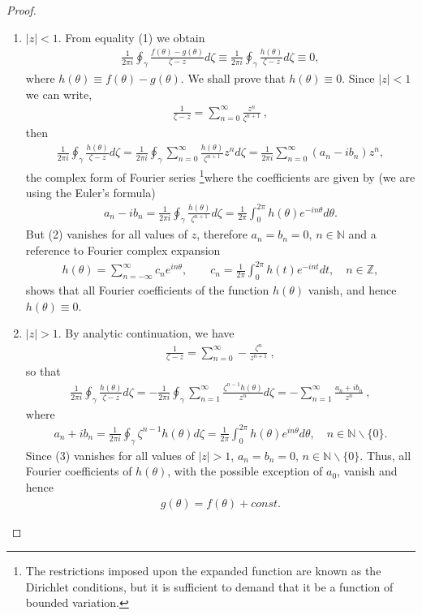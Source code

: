 \documentclass[12pt]{article}
\begin{document}
\begin{proof}
\begin{enumerate}
\item $|z|<1$. From equality (1) we obtain
\begin{align*}
\frac{1}{2\pi i}\oint_\gamma\frac{f(\theta)-g(\theta)}{\zeta-z}d\zeta\equiv
\frac{1}{2\pi i}\oint_\gamma\frac{h(\theta)}{\zeta-z}d\zeta\equiv 0,
\end{align*}
where $h(\theta)\equiv f(\theta)-g(\theta)$. We shall prove that $h(\theta)\equiv 0$. Since $|z|<1$ we can write,
\begin{align*}
\frac{1}{\zeta-z}=\sum_{n=0}^\infty\frac{z^n}{\zeta^{n+1}}\:,
\end{align*}
then
\begin{align}
\frac{1}{2\pi i}\oint_\gamma\frac{h(\theta)}{\zeta-z}d\zeta=
\frac{1}{2\pi i}
\oint_\gamma\sum_{n=0}^\infty\frac{h(\theta)}{\zeta^{n+1}}z^n d\zeta=
\frac{1}{2\pi i}\sum_{n=0}^\infty(a_n-ib_n)z^n,
\end{align}
the complex form of Fourier series {\footnote{The restrictions imposed upon the expanded function are known as the Dirichlet conditions, but it is sufficient to demand that it be a function of bounded variation.}}where the coefficients are given by (we are using the Euler's formula)
\begin{align*}
a_n-ib_n=\frac{1}{2\pi i}\oint_\gamma\frac{h(\theta)}{\zeta^{n+1}}d\zeta
=\frac{1}{2\pi}\int_0^{2\pi}\!\!h(\theta)e^{-in\theta}d\theta.
\end{align*}
But (2) vanishes for all values of $z$, therefore $a_n=b_n=0,\, n\in\mathbb{N}$ and a reference to Fourier complex expansion 
\begin{align*}
h(\theta)=\sum_{n=-\infty}^\infty c_ne^{in\theta}, \qquad 
c_n=\frac{1}{2\pi}\int_0^{2\pi}h(t)e^{-int}dt, \quad n\in\mathbb{Z},
\end{align*}
shows that all Fourier coefficients of the function $h(\theta)$ vanish, and hence $h(\theta)\equiv 0$. 
\item $|z|>1$. By analytic continuation, we have
\begin{align*}
\frac{1}{\zeta-z}=\sum_{n=0}^\infty -\frac{\zeta^n}{z^{n+1}}\:,
\end{align*}
so that
\begin{align}
\frac{1}{2\pi i}\oint_\gamma\frac{h(\theta)}{\zeta-z}d\zeta=
-\frac{1}{2\pi i}
\oint_\gamma\sum_{n=1}^\infty\frac{\zeta^{n-1}h(\theta)}{z^n}d\zeta=
-\sum_{n=1}^\infty\frac{a_n+ib_n}{z^n}\:,
\end{align}
where
\begin{align*}
a_n+ib_n=\frac{1}{2\pi i}\oint_\gamma\zeta^{n-1}h(\theta)d\zeta=
\frac{1}{2\pi}\int_0^{2\pi}\!\!h(\theta)e^{in\theta}d\theta, \quad 
n\in\mathbb{N}\backslash\{0\}.
\end{align*}
Since (3) vanishes for all values of $|z|>1$, 
$a_n=b_n=0,\, n\in\mathbb{N}\backslash\{0\}$. Thus, all Fourier coefficients of $h(\theta)$, with the possible exception of $a_0$, vanish and hence
\begin{align*}
g(\theta)=f(\theta)+const.
\end{align*}
\end{enumerate}
\end{proof}
\end{document}
